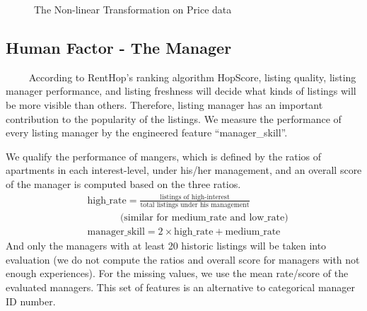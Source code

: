 \documentclass{article}
\begin{document}
\begin{figure}[h]
\centering
{}
\caption{The Non-linear Transformation on Price data}\label{nlprice}
\end{figure}

\subsection{Human Factor - The Manager}

~~~~ According to RentHop's ranking algorithm HopScore, listing quality, listing manager performance, and listing freshness will decide what kinds of listings will be more visible than others. Therefore, listing manager has an important contribution to the popularity of the listings. We measure the performance of every listing manager by the engineered feature ``manager\_skill''. 

We qualify the performance of mangers, which is defined by the ratios of apartments in each interest-level, under his/her management, and an overall score of the manager is computed based on the three ratios.
\begin{align*}
& \text{high\_rate} = \frac{\text{listings of high-interest}}{\text{total listings under his management}} \\
&~~~~~~~~~~~~~~~\text{(similar for medium\_rate and low\_rate)}\\
& \text{manager\_skill} = 2\times\text{high\_rate} + \text{medium\_rate}
\end{align*}
 And only the managers with at least 20 historic listings will be taken into evaluation (we do not compute the ratios and overall score for managers with not enough experiences). For the missing values, we use the mean rate/score of the evaluated managers. This set of features is an alternative to categorical manager ID number.
\end{document}
